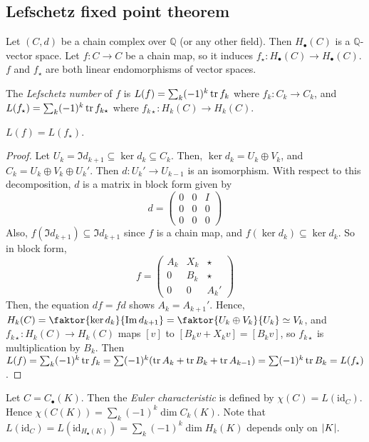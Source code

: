 \subsection{Lefschetz fixed point theorem}
Let \( (C, d) \) be a chain complex over \( \mathbb Q \) (or any other field).
Then \( H_\bullet(C) \) is a \( \mathbb Q \)-vector space.
Let \( f \colon C \to C \) be a chain map, so it induces \( f_\star \colon H_\bullet(C) \to H_\bullet(C) \).
\( f \) and \( f_\star \) are both linear endomorphisms of vector spaces.
\begin{definition}
	The \emph{Lefschetz number} of \( f \) is \( L(f) = \sum_k (-1)^k \tr f_k \) where \( f_k \colon C_k \to C_k \), and \( L(f_\star) = \sum_k (-1)^k \tr f_{k\star} \) where \( f_{k\star} \colon H_k(C) \to H_k(C) \).
\end{definition}
\begin{proposition}
	\( L(f) = L(f_\star) \).
\end{proposition}
\begin{proof}
	Let \( U_k = \Im d_{k+1} \subseteq \ker d_k \subseteq C_k \).
	Then, \( \ker d_k = U_k \oplus V_k \), and \( C_k = U_k \oplus V_k \oplus U_k' \).
	Then \( d \colon U_k' \to U_{k-1} \) is an isomorphism.
	With respect to this decomposition, \( d \) is a matrix in block form given by
	\[ d = \begin{pmatrix}
		0 & 0 & I \\
		0 & 0 & 0 \\
		0 & 0 & 0
	\end{pmatrix} \]
	Also, \( f(\Im d_{k+1}) \subseteq \Im d_{k+1} \) since \( f \) is a chain map, and \( f(\ker d_k) \subseteq \ker d_k \).
	So in block form,
	\[ f = \begin{pmatrix}
		A_k & X_k & \star \\
		0 & B_k & \star \\
		0 & 0 & A_k'
	\end{pmatrix} \]
	Then, the equation \( df = fd \) shows \( A_k = A_{k+1}' \).
	Hence, \( H_k(C) = \faktor{\ker d_k}{\Im d_{k+1}} = \faktor{U_k \oplus V_k}{U_k} \simeq V_k \), and \( f_{k\star} \colon H_k(C) \to H_k(C) \) maps \( [v] \) to \( [B_k v + X_k v] = [B_k v] \), so \( f_{k\star} \) is multiplication by \( B_k \).
	Then \( L(f) = \sum_k (-1)^k \tr f_k = \sum (-1)^k (\tr A_k + \tr B_k + \tr A_{k-1}) = \sum (-1)^k \tr B_k = L(f_\star) \).
\end{proof}
\begin{definition}
	Let \( C = C_\bullet(K) \).
	Then the \emph{Euler characteristic} is defined by \( \chi(C) = L(\mathrm{id}_C) \).
	Hence \( \chi(C(K)) = \sum_k (-1)^k \dim C_k(K) \).
	Note that \( L(\mathrm{id}_C) = L(\mathrm{id}_{H_\bullet(K)}) = \sum_k (-1)^k \dim H_k(K) \) depends only on \( \abs{K} \).
\end{definition}
